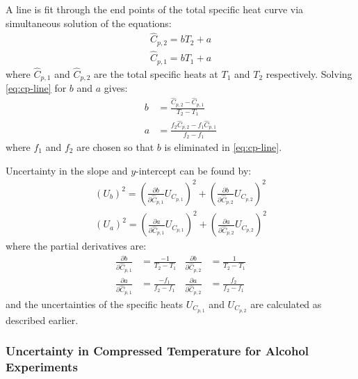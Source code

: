 \documentclass[../main.tex]{subfiles}
\begin{document}
A line is fit through the end points of the total specific heat curve
via simultaneous solution of the equations:
%
\begin{equation}
\label{eq:cp-line}
\begin{split}
\hat{C}_{p,2} = b T_2 + a \\
\hat{C}_{p,1} = b T_1 + a
\end{split}
\end{equation}
%
where $\hat{C}_{p,1}$ and $\hat{C}_{p,2}$ are the total specific heats
at $T_1$ and $T_2$ respectively. Solving \cref{eq:cp-line} for
$b$ and $a$ gives:
%
\begin{equation}
\label{eq:cp-slope-intercept}
\begin{split}
b &= \frac{\hat{C}_{p,2} - \hat{C}_{p,1}}{T_2 - T_1} \\[0.5em]
a &= \frac{f_2 \hat{C}_{p,2} - f_1 \hat{C}_{p,1}}{f_2-f_1}
\end{split}
\end{equation}
%
where $f_1$ and $f_2$ are chosen so that $b$ is eliminated in
\cref{eq:cp-line}.

Uncertainty in the slope and $y$-intercept can be found by:
%
\begin{equation}
\begin{split}
\left(U_{b}\right)^2 = \left(\frac{\partial b}{\partial \hat{C}_{p,1}}U_{C_{p,1}}\right)^2 + \left(\frac{\partial b}{\partial \hat{C}_{p,2}}U_{C_{p,2}}\right)^2 \\[0.5em]
\left(U_{a}\right)^2 = \left(\frac{\partial a}{\partial \hat{C}_{p,1}}U_{C_{p,1}}\right)^2 + \left(\frac{\partial a}{\partial \hat{C}_{p,2}}U_{C_{p,2}}\right)^2
\end{split}
\end{equation}
%
where the partial derivatives are:
%
\begin{align}
\frac{\partial b}{\partial \hat{C}_{p,1}} &= \frac{-1}{T_2 - T_1} & \frac{\partial b}{\partial \hat{C}_{p,2}} &= \frac{1}{T_2 - T_1} \\
\frac{\partial a}{\partial \hat{C}_{p,1}} &= \frac{-f_1}{f_2 - f_1} & \frac{\partial a}{\partial \hat{C}_{p,2}} &= \frac{f_2}{f_2 - f_1}
\end{align}
%
and the uncertainties of the specific heats $U_{C_{p,1}}$ and $U_{C_{p,2}}$
are calculated as described earlier.

\subsubsection{Uncertainty in Compressed Temperature for Alcohol Experiments}
\label{sec:unc-alcohol}
\end{document}
